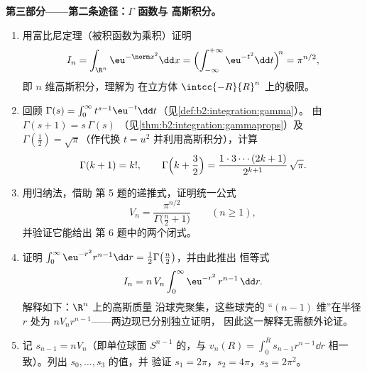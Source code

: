 \begin{problem}[{周末问题——$V_n =
\pi^{n/2}/\Gamma(\frac n2 + 1)$，以及高维的
奇异现象}]
\medskip
\noindent\textbf{第三部分——第二条途径：$\Gamma$ 函数与
高斯积分。}
\begin{enumerate}[resume]
  \item 用富比尼定理（被积函数为乘积）证明
        \[
        I_n = \int_{\R^n}\eu^{-\norm
        x^2}\dd x
        = \Bigl(\int_{-\infty}^{+\infty}
        \eu^{-t^2}\dd t\Bigr)^{\!n} = \pi^{n/2},
        \]
        即 $n$ 维高斯积分，理解为
        在立方体 $\intcc{-R}{R}^n$ 上的极限。
  \item 回顾 $\Gamma(s) = \int_0^\infty t^{s-1}\eu^{-t}\dd
        t$（见\cref{def:b2:integration:gamma}）。
        由 $\Gamma(s+1) = s\,\Gamma(s)$
        （见\cref{thm:b2:integration:gammaprops}）及
        $\Gamma(\tfrac12) = \sqrt\pi$（作代换 $t = u^2$
        并利用高斯积分），计算
        \[
        \Gamma(k + 1) = k!,
        \qquad
        \Gamma\Bigl(k + \frac32\Bigr) =
        \frac{1\cdot3\cdots(2k+1)}{2^{k+1}}\,\sqrt\pi .
        \]
  \item 用归纳法，借助
        第 5 题的递推式，证明统一公式
        \[
        V_n = \frac{\pi^{n/2}}{\Gamma\bigl(\frac n2 +
        1\bigr)} \qquad (n \geq 1),
        \]
        并验证它能给出
        第 6 题中的两个闭式。
  \item 证明 $\int_0^\infty \eu^{-r^2}r^{n-1}\dd r =
        \tfrac12\Gamma\bigl(\tfrac n2\bigr)$，并由此推出
        恒等式
        \[
        I_n = n\,V_n\int_0^\infty \eu^{-r^2}\,r^{n-1}\,\dd r.
        \]
        解释如下：$\R^n$ 上的高斯质量
        沿球壳聚集，这些球壳的
        “$(n-1)$ 维”在半径 $r$ 处为
        $nV_nr^{n-1}$——两边现已分别独立证明，
        因此这一解释无需额外论证。
  \item 记 $s_{n-1} = nV_n$（即单位球面
        $S^{n-1}$ 的，与 $v_n(R) = \int_0^R
        s_{n-1}r^{n-1}\dd r$ 相一致）。列出 $s_0, \dots, s_3$ 的值，并
        验证 $s_1 = 2\pi$，$s_2 = 4\pi$，$s_3 = 2\pi^2$。
\end{enumerate}


\end{problem}
